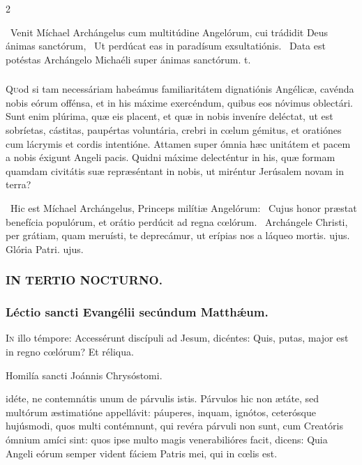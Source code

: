 \documentclass[9pt,twoside]{extarticle}
\begin{document}
\begin{multicols}{2}
\begin{tightlist}{}
\item {}~Venit Míchael Archángelus cum multitúdine Angelórum, cui trádidit Deus ánimas sanctórum, \textred{*}~Ut perdúcat eas in paradísum exsultatiónis. ~Data est potéstas Archángelo Michaéli super ánimas sanctórum. t.
\end{tightlist}

\subsubsection*{\center {}}
\lettrine{Q}uod si tam necessáriam habeámus familiaritátem dignatiónis Angélicæ, cavénda nobis eórum offénsa, et in his máxime exercéndum, quibus eos nóvimus oblectári. Sunt enim plúrima, quæ eis placent, et quæ in nobis inveníre deléctat, ut est sobríetas, cástitas, paupértas voluntária, crebri in cœlum gémitus, et oratiónes cum lácrymis et cordis intentióne. Attamen super ómnia hæc unitátem et pacem a nobis éxigunt Angeli pacis. Quidni máxime delecténtur in his, quæ formam quamdam civitátis suæ repræséntant in nobis, ut miréntur Jerúsalem novam in terra?

\begin{tightlist}{}
\item {}~Hic est Míchael Archángelus, Princeps milítiæ Angelórum: \textred{*}~Cujus honor præstat benefícia populórum, et orátio perdúcit ad regna cœlórum. ~Archángele Christi, per grátiam, quam meruísti, te deprecámur, ut erípias nos a láqueo mortis. ujus. Glória Patri. ujus.
\end{tightlist}

\subsubsection*{\center \textsc{IN TERTIO NOCTURNO.}}
\subsubsection*{\center Léctio sancti Evangélii secúndum Matthǽum.}
\lettrine{I}n illo témpore: Accessérunt discípuli ad Jesum, dicéntes: Quis, putas, major est in regno cœlórum? Et réliqua.

\begin{center}Homilía sancti Joánnis Chrysóstomi.\\
\end{center}
idéte, ne contemnátis unum de párvulis istis. Párvulos hic non ætáte, sed multórum æstimatióne appellávit: páuperes, inquam, ignótos, ceterósque hujúsmodi, quos multi contémnunt, qui revéra párvuli non sunt, cum Creatóris ómnium amíci sint: quos ipse multo magis venerabilióres facit, dicens: Quia Angeli eórum semper vident fáciem Patris mei, qui in cœlis est.


\end{multicols}
\end{document}
